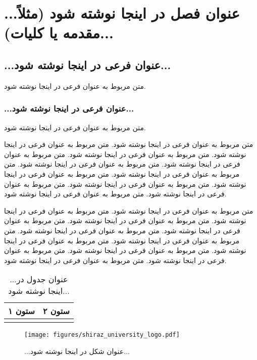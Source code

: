 \chapter{...عنوان فصل در اینجا نوشته شود (مثلاً مقدمه یا کلیات)...}

\section{...عنوان فرعی در اینجا نوشته شود...}
متن مربوط به عنوان فرعی در اینجا نوشته شود.

\subsection{...عنوان فرعی در اینجا نوشته شود...}
متن مربوط به عنوان فرعی در اینجا نوشته شود.

\newpage
متن مربوط به عنوان فرعی در اینجا نوشته شود.\cite{sharif_1390}
متن مربوط به عنوان فرعی در اینجا نوشته شود.\cite{ghalamfarsa_1394}
متن مربوط به عنوان فرعی در اینجا نوشته شود.\cite{howitt_2008}
متن مربوط به عنوان فرعی در اینجا نوشته شود.\cite{ranzijn_2009}
متن مربوط به عنوان فرعی در اینجا نوشته شود.\cite{datnoff_2001}
متن مربوط به عنوان فرعی در اینجا نوشته شود.\cite{sas}
متن مربوط به عنوان فرعی در اینجا نوشته شود.\cite{rahimian_1392}
متن مربوط به عنوان فرعی در اینجا نوشته شود.\cite{alishahi_1393}
متن مربوط به عنوان فرعی در اینجا نوشته شود.\cite{andjic_2007}
متن مربوط به عنوان فرعی در اینجا نوشته شود.\cite{sohrabi_2011}

\newpage
متن مربوط به عنوان فرعی در اینجا نوشته شود.\cite{game_2001}
متن مربوط به عنوان فرعی در اینجا نوشته شود.\cite{habibi_1394}
متن مربوط به عنوان فرعی در اینجا نوشته شود.\cite{ignatov_2013}
متن مربوط به عنوان فرعی در اینجا نوشته شود.\cite{bekker_2007}
متن مربوط به عنوان فرعی در اینجا نوشته شود.\cite{aps}
متن مربوط به عنوان فرعی در اینجا نوشته شود.\cite{wikipedia}
متن مربوط به عنوان فرعی در اینجا نوشته شود.
متن مربوط به عنوان فرعی در اینجا نوشته شود.
متن مربوط به عنوان فرعی در اینجا نوشته شود.
متن مربوط به عنوان فرعی در اینجا نوشته شود.

\newpage
\begin{table}[]
    \centering
    \caption{...عنوان جدول در اینجا نوشته شود...}
    \begin{tabular}{|c|c|}
        \hline
        ستون ۱ & ستون ۲ \\
        \hline
        & \\
        \hline
    \end{tabular}
\end{table}

\begin{figure}
    \centering
    \texttt{[image: figures/shiraz\_university\_logo.pdf]}
    \caption{...عنوان شکل در اینجا نوشته شود...}
    \label{fig:enter-label}
\end{figure}
